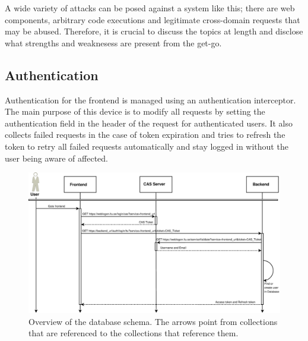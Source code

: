 A wide variety of attacks can be posed against a system like this; there are web components, arbitrary code executions and legitimate cross-domain requests that may be abused. Therefore, it is crucial to discuss the topics at length and disclose what strengths and weaknesess are present from the get-go.

\subsection{Authentication}
Authentication for the frontend is managed using an authentication interceptor. The main purpose of this device is to modify all requests by setting the authentication field in the header of the request for authenticated users. It also collects failed requests in the case of token expiration and tries to refresh the token to retry all failed requests automatically and stay logged in without the user being aware of affected.
\begin{figure}
    \centering
    \includegraphics[width=\textwidth]{img/authentication_sequence.eps}
    \caption{Overview of the database schema. The arrows point from collections that are referenced to the collections that reference them.}
    \label{fig:auth}
\end{figure}

